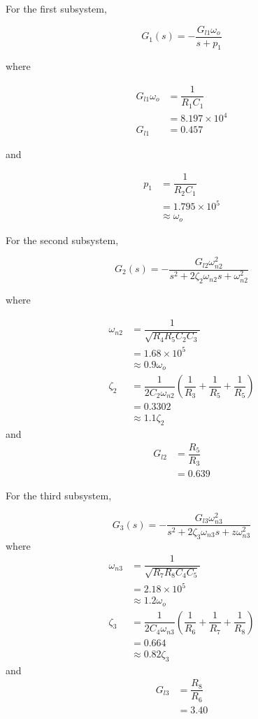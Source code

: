 For the first subsystem,

\begin{equation*}
G_1(s) = -\dfrac{G_{l1}\omega_o}{s+p_1}
\end{equation*}

where

\begin{align*}
G_{l1}\omega_o &= \dfrac{1}{R_1C_1}\\
&= 8.197 \times 10^4\\ %
G_{l1} &= 0.457
\end{align*}

and

\begin{align*}
p_1 &= \dfrac{1}{R_2C_1}\\
&= 1.795\times 10^5 \\
&\approx \omega_o %
\end{align*}

For the second subsystem,

\begin{equation*}
G_2(s) = -\dfrac{G_{l2}\omega_{n2}^2}{s^2+2\zeta_2\omega_{n2} s + \omega_{n2}^2}
\end{equation*}

where

\begin{align*}
\omega_{n2} &= \dfrac{1}{\sqrt{R_4R_5C_2C_3}}\\
&= 1.68 \times 10^5 \\
&\approx 0.9 \omega_o\\
\zeta_2 &= \dfrac{1}{2C_2\omega_{n2}}\left(\dfrac{1}{R_3}+\dfrac{1}{R_5}+\dfrac{1}{R_5}\right)\\
&= 0.3302 \\
&\approx 1.1\zeta_2
\end{align*}
and
\begin{align*}
G_{l2} &= \dfrac{R_5}{R_3}\\
&=0.639
\end{align*}

For the third subsystem,

\begin{equation*}
G_3(s) = -\dfrac{G_{l3}\omega_{n3}^2}{s^2+2\zeta_3\omega_{n3} s +z \omega_{n3}^2}
\end{equation*}
where
\begin{align*}
\omega_{n3} &= \dfrac{1}{\sqrt{R_7R_8C_4C_5}}\\
&= 2.18 \times 10^5 \\
&\approx 1.2 \omega_o\\
\zeta_3 &= \dfrac{1}{2C_4\omega_{n3}}\left(\dfrac{1}{R_6}+\dfrac{1}{R_7}+\dfrac{1}{R_8}\right)\\
&= 0.664 \\
&\approx 0.82\zeta_3
\end{align*}
and
\begin{align*}
G_{l3} &= \dfrac{R_8}{R_6}\\
&=3.40
\end{align*}

